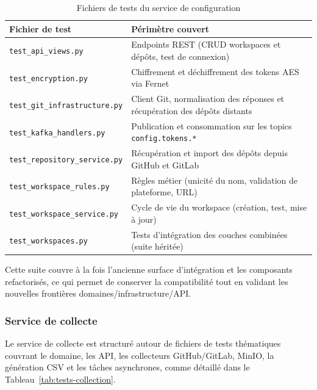 \begin{table}[H]
\centering
\small
\caption{Fichiers de tests du service de configuration}
\label{tab:tests-config}
\begin{tabular}{|>{\raggedright\arraybackslash}p{6cm}
                |>{\raggedright\arraybackslash}p{7cm}|}
\hline
\textbf{Fichier de test} & \textbf{Périmètre couvert} \\
\hline
\texttt{test\_api\_views.py} & Endpoints REST (CRUD workspaces et dépôts, test de connexion) \\
\hline
\texttt{test\_encryption.py} & Chiffrement et déchiffrement des tokens AES via Fernet \\
\hline
\texttt{test\_git\_infrastructure.py} & Client Git, normalisation des réponses et récupération des dépôts distants \\
\hline
\texttt{test\_kafka\_handlers.py} & Publication et consommation sur les topics \texttt{config.tokens.*} \\
\hline
\texttt{test\_repository\_service.py} & Récupération et import des dépôts depuis GitHub et GitLab \\
\hline
\texttt{test\_workspace\_rules.py} & Règles métier (unicité du nom, validation de plateforme, URL) \\
\hline
\texttt{test\_workspace\_service.py} & Cycle de vie du workspace (création, test, mise à jour) \\
\hline
\texttt{test\_workspaces.py} & Tests d'intégration des couches combinées (suite héritée) \\
\hline
\end{tabular}
\end{table}

Cette suite couvre à la fois l'ancienne surface d'intégration et les composants refactorisés,
ce qui permet de conserver la compatibilité tout en validant les nouvelles frontières
domaines/infrastructure/API.

\subsubsection*{Service de collecte}

Le service de collecte est structuré autour de fichiers de tests thématiques couvrant le domaine,
les API, les collecteurs GitHub/GitLab, MinIO, la génération CSV et les tâches asynchrones,
comme détaillé dans le Tableau~\ref{tab:tests-collection}.

